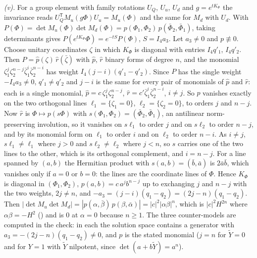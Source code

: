 \emph{(v).} For a group element with family rotations $U_{Q}$, $U_{u}$, $U_{d}$ and $g = e^{tK_{\Phi}}$ the invariance reads $U_{Q}^{\mathsf T}M_{u}(g\Phi)U_{u} = M_{u}(\Phi)$ and the same for $M_{d}$ with $U_{d}$. With $P(\Phi) = \det M_{u}(\Phi)\det M_{d}(\Phi) = p(\Phi_{1}, \Phi_{2})\,p(\bar\Phi_{2}, \bar\Phi_{1})$, taking determinants gives $P(e^{tK_{\Phi}}\Phi) = e^{-tS}P(\Phi)$, $S = I_{4}a_{3}$. Let $a_{3} \neq 0$ and $p \not\equiv 0$. Choose unitary coordinates $\zeta$ in which $K_{\Phi}$ is diagonal with entries $I_{4}q'_{1}$, $I_{4}q'_{2}$. Then $P = \hat{p}(\zeta)\,\hat{r}(\bar\zeta)$ with $\hat{p}$, $\hat{r}$ binary forms of degree $n$, and the monomial $\zeta_{1}^{j}\zeta_{2}^{n-j}\bar\zeta_{1}^{i}\bar\zeta_{2}^{n-i}$ has weight $I_{4}(j - i)(q'_{1} - q'_{2})$. Since $P$ has the single weight $-I_{4}a_{3} \neq 0$, $q'_{1} \neq q'_{2}$ and $j - i$ is the same for every pair of monomials of $\hat{p}$ and $\hat{r}$: each is a single monomial, $\hat{p} = c\,\zeta_{1}^{j}\zeta_{2}^{n-j}$, $\hat{r} = c'\bar\zeta_{1}^{i}\bar\zeta_{2}^{n-i}$, $i \neq j$. So $p$ vanishes exactly on the two orthogonal lines $\ell_{1} = \{\zeta_{1} = 0\}$, $\ell_{2} = \{\zeta_{2} = 0\}$, to orders $j$ and $n - j$. Now $\hat{r}$ is $\Phi \mapsto p(s\Phi)$ with $s(\Phi_{1}, \Phi_{2}) = (\bar\Phi_{2}, \bar\Phi_{1})$, an antilinear norm-preserving involution, so it vanishes on $s\ell_{1}$ to order $j$ and on $s\ell_{2}$ to order $n - j$, and by its monomial form on $\ell_{1}$ to order $i$ and on $\ell_{2}$ to order $n - i$. As $i \neq j$, $s\ell_{1} \neq \ell_{1}$ where $j > 0$ and $s\ell_{2} \neq \ell_{2}$ where $j < n$, so $s$ carries one of the two lines to the other, which is its orthogonal complement, and $i = n - j$. For a line spanned by $(a, b)$ the Hermitian product with $s(a, b) = (\bar{b}, \bar{a})$ is $2\bar{a}\bar{b}$, which vanishes only if $a = 0$ or $b = 0$: the lines are the coordinate lines of $\Phi$. Hence $K_{\Phi}$ is diagonal in $(\Phi_{1}, \Phi_{2})$, $p(a, b) = c\,a^{j}b^{n-j}$ up to exchanging $j$ and $n - j$ with the two weights, $2j \neq n$, and $-a_{3} = (j - i)(q_{1} - q_{2}) = (2j - n)(q_{1} - q_{2})$. Then $|\det M_{u}\det M_{d}| = |p(\alpha, \bar\beta)\,p(\beta, \bar\alpha)| = |c|^{2}|\alpha\beta|^{n}$, which is $|c|^{2}H^{2n}$ where $\alpha\beta = -H^{2}$ () and is $0$ at $\alpha = 0$ because $n \geq 1$. The three counter-models are computed in the check: in each the solution space contains a generator with $a_{3} = -(2j - n)(q_{1} - q_{2}) \neq 0$, and $p$ is the stated monomial ($j = n$ for $\tilde{Y} = 0$ and for $Y = 1$ with $\tilde{Y}$ nilpotent, since $\det(a + b\tilde{Y}) = a^{n}$).

